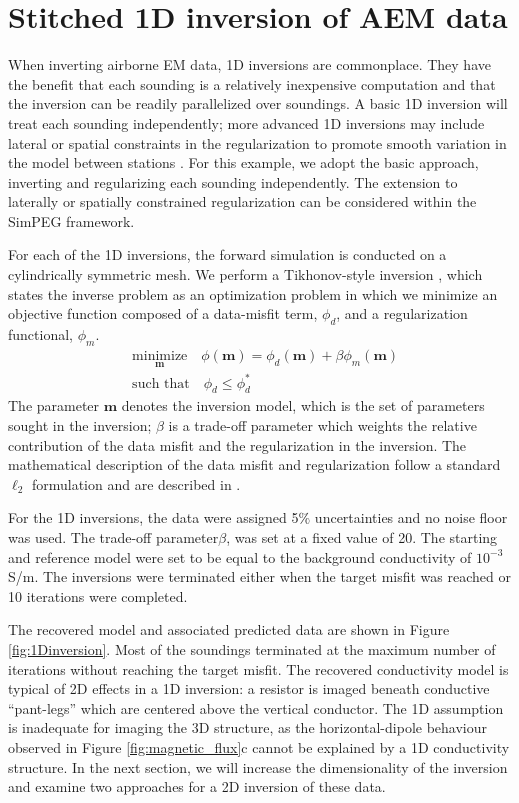 \documentclass[paper]{geophysics}
\begin{document}
\section{Stitched 1D inversion of AEM data}
When inverting airborne EM data, 1D inversions are commonplace. They have the benefit that each sounding is a relatively inexpensive computation and that the inversion can be readily parallelized over soundings. A basic 1D inversion will treat each sounding independently; more advanced 1D inversions may include lateral or spatial constraints in the regularization to promote smooth variation in the model between stations \citep{Viezzoli2008,Viezzoli2009}. For this example, we adopt the basic approach, inverting and regularizing each sounding independently. The extension to laterally or spatially constrained regularization can be considered within the SimPEG framework.

For each of the 1D inversions, the forward simulation is conducted on a cylindrically symmetric mesh. We perform a Tikhonov-style inversion \citep{Tikhonov1977}, which states the inverse problem as an optimization problem in which we minimize an objective function composed of a data-misfit term, $\phi_d$, and a regularization functional, $\phi_m$.
\begin{equation}
\begin{split}
&\underset{\mathbf{m}}{\text{minimize}} \quad \phi(\mathbf{m}) = \phi_d(\mathbf{m}) + \beta \phi_m(\mathbf{m}) \\
&\text{such that} \quad \phi_d \leq \phi_d^*
\end{split}
\label{eq:inverse_problem}
\end{equation}
The parameter $\mathbf{m}$ denotes the inversion model, which is the set of parameters sought in the inversion; $\beta$ is a trade-off parameter which weights the relative contribution of the data misfit and the regularization in the inversion. The mathematical description of the data misfit and regularization follow a standard $\ell_2$ formulation and are described in \cite{cockett2015}.

For the 1D inversions, the data were assigned 5$\%$ uncertainties and no noise floor was used. The trade-off parameter$\beta$, was set at a fixed value of 20. The starting and reference model were set to be equal to the background conductivity of $10^{-3}$ S/m. The inversions were terminated either when the target misfit was reached or 10 iterations were completed.

The recovered model and associated predicted data are shown in Figure \ref{fig:1Dinversion}. Most of the soundings terminated at the maximum number of iterations without reaching the target misfit. The recovered conductivity model is typical of 2D effects in a 1D inversion: a resistor is imaged beneath conductive ``pant-legs'' which are centered above the vertical conductor. The 1D assumption is inadequate for imaging the 3D structure, as the horizontal-dipole behaviour observed in Figure \ref{fig:magnetic_flux}c cannot be explained by a 1D conductivity structure. In the next section, we will increase the dimensionality of the inversion and examine two approaches for a 2D inversion of these data.
\end{document}
